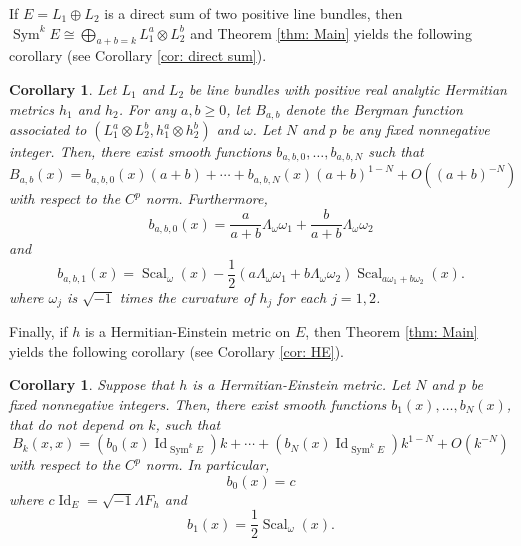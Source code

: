 \documentclass{amsart}
\newtheorem{cor}[thm]{Corollary}
\theoremstyle{definition}
\theoremstyle{remark}
\numberwithin{equation}{section}
\DeclareMathOperator{\Sym}{Sym}
\DeclareMathOperator{\Id}{Id}
\DeclareMathOperator{\Scal}{Scal}
\begin{document}
If $E = L_1 \oplus L_2$ is a direct sum of two positive line bundles, then $\Sym^k E \cong \bigoplus_{a+b = k} L_1^a \otimes L_2^b$ and Theorem \ref{thm: Main} yields the following corollary (see Corollary \ref{cor: direct sum}).
\begin{cor}
Let $L_1$ and $L_2$ be line bundles with positive real analytic Hermitian metrics $h_1$ and $h_2$. For any $a,b \geq 0$, let $B_{a,b}$ denote the Bergman function associated to $(L_1^a \otimes L_2^b, h_1^a \otimes h_2^b)$ and $\omega$. Let $N$ and $p$ be any fixed nonnegative integer. Then, there exist smooth functions $b_{a,b,0}, \dotsc, b_{a,b,N}$ such that
\begin{equation*}
    B_{a,b}(x) = b_{a,b,0}(x)(a+b) + \dotsb + b_{a,b,N}(x) (a+b)^{1-N} + O \left ((a+b)^{-N} \right )
\end{equation*}
with respect to the $C^p$ norm. Furthermore,
\begin{equation*}
    b_{a,b,0}(x) = \frac{a}{a+b} \Lambda_\omega \omega_1 + \frac{b}{a+b} \Lambda_\omega \omega_2
\end{equation*}
and
\begin{equation*}
    b_{a,b,1}(x) = \Scal_\omega(x) -\frac{1}{2}  \left ( a \Lambda_\omega \omega_1 + b \Lambda_\omega \omega_2 \right ) \Scal_{a\omega_1 + b\omega_2}(x). 
\end{equation*}
where $\omega_j$ is $\sqrt{-1}$ times the curvature of $h_j$ for each $j=1,2$.
\end{cor}

Finally, if $h$ is a Hermitian-Einstein metric on $E$, then Theorem \ref{thm: Main} yields the following corollary (see Corollary \ref{cor: HE}).
\begin{cor}
Suppose that $h$ is a Hermitian-Einstein metric. Let $N$ and $p$ be fixed nonnegative integers. Then, there exist smooth functions $b_{1}(x), \dotsc, b_N(x)$, that do not depend on $k$, such that
\begin{equation*}
    B_k(x,x) = \left ( b_{0}(x) \Id_{\Sym^k E}\right )k + \dotsb + \left ( b_{N}(x) \Id_{\Sym^k E} \right ) k^{1-N} + O(k^{-N})
\end{equation*}
with respect to the $C^p$ norm. In particular,
\begin{equation*}
b_{0}(x) = c
\end{equation*}
where $c\Id_E = \sqrt{-1} \Lambda F_h$ and 
\begin{equation*}
b_{1}(x) = \frac{1}{2}\Scal_\omega(x).
\end{equation*}
\end{cor}
\end{document}
